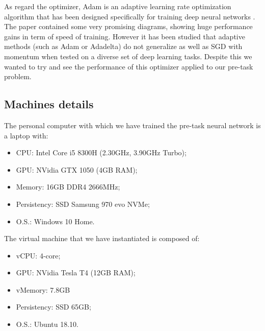 As regard the optimizer, Adam is an adaptive learning rate optimization algorithm that has been designed specifically for training deep neural networks \cite{adam_trend}. The paper contained some very promising diagrams, showing huge performance gains in term of speed of training. However it has been studied that adaptive methods (such as Adam or Adadelta) do not generalize as well as SGD with momentum \cite{adam_generalization} when tested on a diverse set of deep learning tasks. Despite this we wanted to try and see the performance of this optimizer applied to our pre-task problem.

\subsection{Machines details}\label{ss:machines}
The personal computer with which we have trained the pre-task neural network is a laptop with:
\begin{itemize}
    \item CPU: Intel Core i5 8300H (2.30GHz, 3.90GHz Turbo);
    \item GPU: NVidia GTX 1050 (4GB RAM);
    \item Memory: 16GB DDR4 2666MHz;
    \item Persistency: SSD Samsung 970 evo NVMe;
    \item O.S.: Windows 10 Home.
\end{itemize}
The virtual machine that we have instantiated is composed of:
\begin{itemize}
    \item vCPU: 4-core;
    \item GPU: NVidia Tesla T4 (12GB RAM);
    \item vMemory: 7.8GB
    \item Persistency: SSD 65GB;
    \item O.S.: Ubuntu 18.10.
\end{itemize}